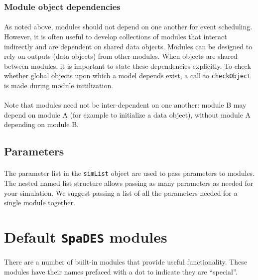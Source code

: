 \documentclass{article}
\begin{document}
\subsubsection{Module object dependencies}

\paragraph{}
As noted above, modules should not depend on one another for event scheduling. However, it is often useful to develop collections of modules that interact indirectly and are dependent on shared data objects. Modules can be designed to rely on outputs (data objects) from other modules. When objects are shared between modules, it is important to state these dependencies explicitly. To check whether global objects upon which a model depends exist, a call to \texttt{checkObject} is made during module initilization.

\paragraph{}
Note that modules need not be inter-dependent on one another: module B may depend on module A (for example to initialize a data object), without module A depending on module B.

\subsection{Parameters}

\paragraph{}
The parameter list in the \texttt{simList} object are used to pass parameters to modules. The nested named list structure allows passing as many parameters as needed for your simulation. We suggest passing a list of all the parameters needed for a single module together.

\newpage

\section{Default \texttt{SpaDES} modules}

\paragraph{}
There are a number of built-in modules that provide useful functionality. These modules have their names prefaced with a dot to indicate they are ``special''.
\end{document}
